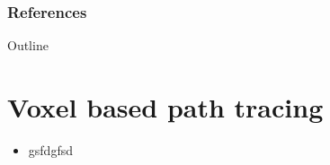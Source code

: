 \documentclass{beamer}
\begin{document}
\begin{frame}[allowframebreaks]
	\frametitle{References}
	
	
\end{frame}

\begin{frame}{Outline}
	\tableofcontents
\end{frame}

\section{Voxel based path tracing}

\begin{frame}
	\begin{itemize}
		\item gsfdgfsd
	\end{itemize}
\end{frame}
\end{document}
